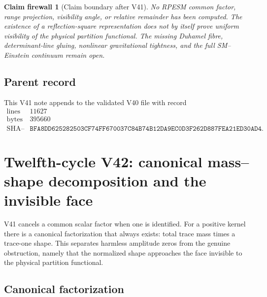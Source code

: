 \documentclass[11pt]{article}
\newtheorem{firewall}[theorem]{Claim firewall}
\theoremstyle{remark}
\begin{document}
\begin{firewall}[Claim boundary after V41]
\label{fire:v12v41-claim}
No RPESM common factor, range projection, visibility angle, or
relative remainder has been computed.  The existence of a
reflection-square representation does not by itself prove uniform
visibility of the physical partition functional.  The missing
Duhamel fibre, determinant-line gluing, nonlinear gravitational
tightness, and the full SM--Einstein continuum remain open.
\end{firewall}

\subsection{Parent record}

This V41 note appends to the validated V40 file with record
\[
\begin{array}{c|c}
\text{lines}&11627\\
\text{bytes}&395660\\
\text{SHA--256}&
\texttt{BFA8DD625282503CF74FF670037C84B74B12DA9EC0D3F262D887FEA21ED30AD4}.
\end{array}
\]


\section{Twelfth-cycle V42: canonical mass--shape decomposition and
the invisible face}
\label{sec:v12v42}

V41 cancels a common scalar factor when one is identified.  For a
positive kernel there is a canonical factorization that always
exists: total trace mass times a trace-one shape.  This separates
harmless amplitude zeros from the genuine obstruction, namely that
the normalized shape approaches the face invisible to the physical
partition functional.

\subsection{Canonical factorization}
\end{document}
